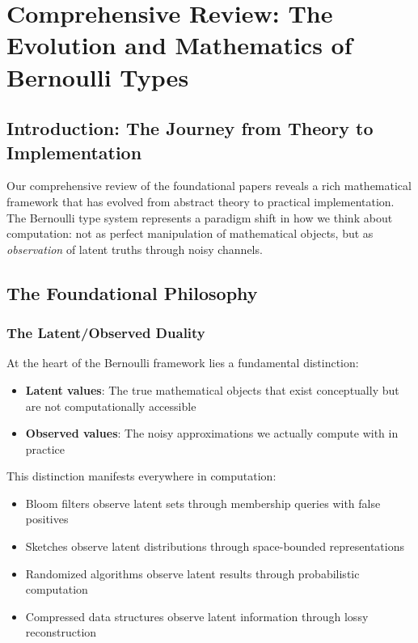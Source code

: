 \chapter{Comprehensive Review: The Evolution and Mathematics of Bernoulli Types}
\label{ch:comprehensive-review}

\section{Introduction: The Journey from Theory to Implementation}

Our comprehensive review of the foundational papers reveals a rich mathematical framework that has evolved from abstract theory to practical implementation. The Bernoulli type system represents a paradigm shift in how we think about computation: not as perfect manipulation of mathematical objects, but as \textit{observation} of latent truths through noisy channels.

\section{The Foundational Philosophy}

\subsection{The Latent/Observed Duality}

At the heart of the Bernoulli framework lies a fundamental distinction:

\begin{definition}
\begin{itemize}
\item \textbf{Latent values}: The true mathematical objects that exist conceptually but are not computationally accessible
\item \textbf{Observed values}: The noisy approximations we actually compute with in practice
\end{itemize}
\end{definition}

This distinction manifests everywhere in computation:
\begin{itemize}
\item Bloom filters observe latent sets through membership queries with false positives
\item Sketches observe latent distributions through space-bounded representations
\item Randomized algorithms observe latent results through probabilistic computation
\item Compressed data structures observe latent information through lossy reconstruction
\end{itemize}

